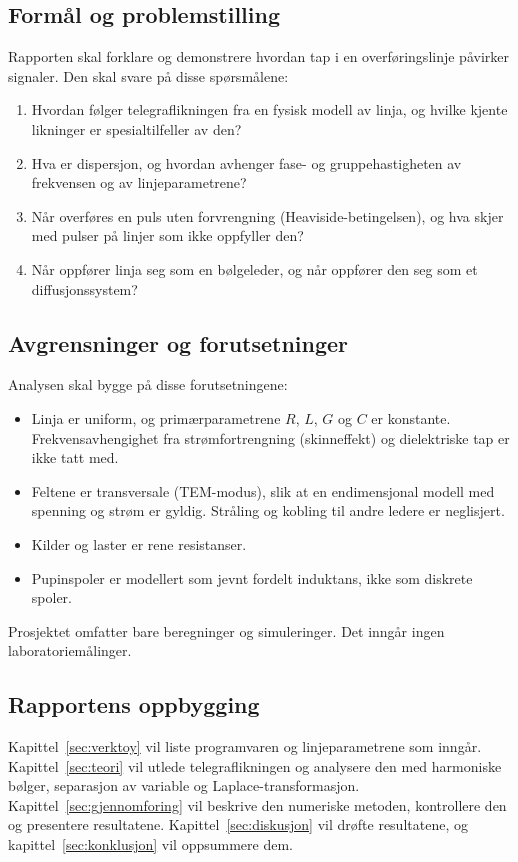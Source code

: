 \documentclass[11pt,a4paper]{article}
\numberwithin{equation}{section}
\numberwithin{figure}{section}
\numberwithin{table}{section}
\begin{document}
\subsection{Formål og problemstilling}
Rapporten skal forklare og demonstrere hvordan tap i en overføringslinje påvirker
signaler. Den skal svare på disse spørsmålene:
\begin{enumerate}
  \item Hvordan følger telegraflikningen fra en fysisk modell av linja, og hvilke
        kjente likninger er spesialtilfeller av den?
  \item Hva er dispersjon, og hvordan avhenger fase- og gruppehastigheten av
        frekvensen og av linjeparametrene?
  \item Når overføres en puls uten forvrengning (Heaviside-betingelsen), og hva
        skjer med pulser på linjer som ikke oppfyller den?
  \item Når oppfører linja seg som en bølgeleder, og når oppfører den seg som
        et diffusjonssystem?
\end{enumerate}

\subsection{Avgrensninger og forutsetninger}
Analysen skal bygge på disse forutsetningene:
\begin{itemize}
  \item Linja er uniform, og primærparametrene $R$, $L$, $G$ og $C$ er konstante.
        Frekvensavhengighet fra strømfortrengning (skinneffekt) og dielektriske tap
        er ikke tatt med.
  \item Feltene er transversale (TEM-modus), slik at en endimensjonal modell med
        spenning og strøm er gyldig. Stråling og kobling til andre ledere er
        neglisjert.
  \item Kilder og laster er rene resistanser.
  \item Pupinspoler er modellert som jevnt fordelt induktans, ikke som
        diskrete spoler.
\end{itemize}
Prosjektet omfatter bare beregninger og simuleringer. Det inngår ingen
laboratoriemålinger.

\subsection{Rapportens oppbygging}
Kapittel~\ref{sec:verktoy} vil liste programvaren og linjeparametrene som inngår.
Kapittel~\ref{sec:teori} vil utlede telegraflikningen og analysere den med
harmoniske bølger, separasjon av variable og Laplace-transformasjon.
Kapittel~\ref{sec:gjennomforing} vil beskrive den numeriske metoden, kontrollere
den og presentere resultatene. Kapittel~\ref{sec:diskusjon} vil drøfte
resultatene, og kapittel~\ref{sec:konklusjon} vil oppsummere dem.
\end{document}
